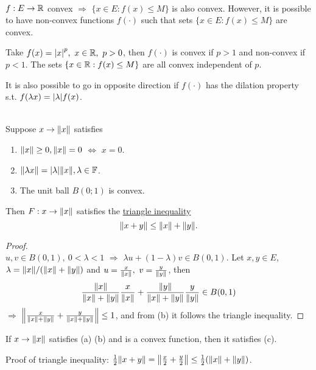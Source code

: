 \begin{remark}\ \\
$f: E \to \mathbb{R}$ convex $\Rightarrow$ $\{x \in E: f(x) \leq M\}$ is also convex. However, it is possible to have non-convex functions $f(\cdot)$ such that sets $\{x \in E: f(x) \leq M\}$ are convex.
\begin{example}
Take $f(x) = \abs{x}^p,\ x \in \mathbb{R},\ p > 0$, then $f(\cdot)$ is convex if $p > 1$ and non-convex if $p < 1$. The sets $\{x \in \mathbb{R}: f(x) \leq M\}$ are all convex independent of $p$.
\end{example}
It is also possible to go in opposite direction if $f(\cdot)$ has the dilation property s.t. $f(\lambda x ) = \abs{\lambda} f(x)$.
\begin{corollary}\label{1.10}\ \\
Suppose $x \to \norm{x}$ satisfies
\begin{enumerate}[label = (\alph*)]
    \item $\norm{x} \geq 0, \norm{x} = 0$ $\Leftrightarrow$ $x = 0$.
    \item $\norm{\lambda x} = \abs{\lambda} \norm{x}, \lambda \in \mathbb{F}$.
    \item The unit ball $B(0;1)$ is convex.
\end{enumerate}
Then $F: x \to \norm{x}$ satisfies the \underline{triangle inequality}
$$\norm{x + y} \leq \norm{x} + \norm{y}.$$
\end{corollary}
\begin{proof}\ \\
    $u,v \in B(0,1),\ 0 < \lambda < 1$ $\Rightarrow$ $\lambda u + (1 - \lambda) v \in B(0,1)$. Let $x,y \in E$, $\lambda = \norm{x} / (\norm{x} + \norm{y})$ and $u = \frac{x}{\norm{x}},\ v = \frac{y}{\norm{y}}$, then
    $$\frac{\norm{x}}{\norm{x} + \norm{y}} \frac{x}{\norm{x}} + \frac{\norm{y}}{\norm{x} + \norm{y}} \frac{y}{\norm{y}} \in B(0,1)$$
$\Rightarrow$ $\norm{\frac{x}{\norm{x} + \norm{y}} + \frac{y}{\norm{x} + \norm{y}}} \leq 1$, and from (b) it follows the triangle inequality.
\end{proof}
\begin{remark}
If $x \to \norm{x}$ satisfies (a) (b) and is a convex function, then it satisfies (c).
\end{remark}
Proof of triangle inequality: $\frac{1}{2} \norm{x + y} = \norm{\frac{x}{2} + \frac{y}{2}} \leq \frac{1}{2} (\norm{x} + \norm{y})$.
\end{remark}

